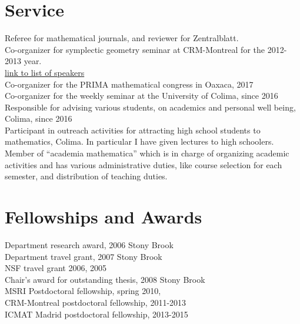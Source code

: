 \documentclass[overlapped,line,letterpaper]{res}
\begin{document}
\begin{resume}
\section {\sc Service}
Referee for mathematical journals, and reviewer for Zentralblatt. \\
Co-organizer for symplectic geometry seminar
at CRM-Montreal for the 2012-2013 year. \\
\href{https://docs.google.com/spreadsheet/ccc?key=0AlBCuxjt683fdHYzY2VaSWl1TU1lckctNjJWVndyTHc&usp=docslist_api}
{link to list of speakers} \\
Co-organizer for the PRIMA mathematical congress in Oaxaca, 2017 \\
Co-organizer for the weekly seminar at the University of Colima, since 2016 \\
Responsible for advising various students, on academics and personal well being, Colima, since 2016 \\
Participant in outreach activities for attracting high school students to mathematics, Colima. In particular I have given lectures to high schoolers. \\
Member of ``academia mathematica'' which is in charge of organizing academic activities and has various administrative duties, like course selection for each semester, and distribution of teaching duties.
\section{\sc Fellowships and Awards}
Department research award, 2006 Stony Brook\\
Department travel grant, 2007 Stony Brook\\
NSF travel grant 2006, 2005 \\
Chair's award for outstanding thesis, 2008 Stony Brook\\
MSRI Postdoctoral fellowship, spring 2010,\\
CRM-Montreal postdoctoral fellowship,  2011-2013\\ ICMAT Madrid
postdoctoral fellowship, 2013-2015

\end{resume}
\end{document}
